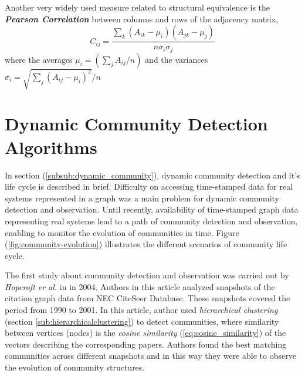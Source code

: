 Another very widely used measure related to structural equivalence is the \textbf{\textit{Pearson Correlation}} between columns and rows of the adjacency matrix,
\begin{equation}
C_{ij} = \dfrac{\sum\limits_{k} (A_{ik} - \mu_i) (A_{jk} - \mu_j)}{n \sigma_i \sigma_j}
\end{equation}
where the averages $\mu_i = (\sum\limits_j A_{ij} / n)$ and the variances $\sigma_i = \sqrt{\sum\limits_j (A_{ij} - \mu_i)^2} / n$

\section{Dynamic Community Detection Algorithms}\label{sec:dynamic_community_algorithms}
In section (\ref{subsub:dynamic_community}), dynamic community detection and it's life cycle is described in brief. Difficulty on accessing time-stamped data for real systems represented in a graph was a main problem for dynamic community detection and observation. Until recently, availability of time-stamped graph data representing real systems lead to a path of community detection and observation, enabling to monitor the evolution of communities in time. Figure (\ref{fig:community-evolution}) illustrates the different scenarios of community life cycle.

The first study about community detection and observation was carried out by \textit{Hopcroft er al.} in  \cite{ref-52} in 2004. Authors in this article analyzed snapshots of the citation graph data from NEC CiteSeer Database. These snapshots covered the period from 1990 to 2001. In this article, author used \textit{hierarchical clustering} (section \ref{sub:hierarchicalclustering}) to detect communities, where similarity between vertices (nodes) is the \textit{cosine similarity} (\ref{eq:cosine_similarity}) of the vectors describing the corresponding papers. Authors found the best matching communities across different snapshots and in this way they were able to observe the evolution of community structures.


